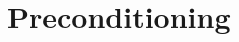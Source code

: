 \documentclass[12pt]{beamer}
\newcommand{\re}[1]{{\textcolor{red}       {#1}}}
\begin{document}
\begin{frame}
{}


  \end{frame}





\section{Preconditioning}
\end{document}
